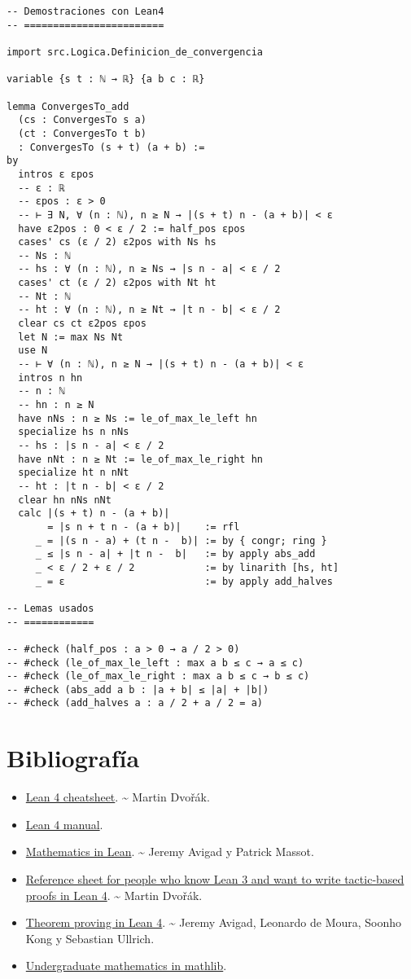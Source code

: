 \begin{verbatim}
-- Demostraciones con Lean4
-- ========================

import src.Logica.Definicion_de_convergencia

variable {s t : ℕ → ℝ} {a b c : ℝ}

lemma ConvergesTo_add
  (cs : ConvergesTo s a)
  (ct : ConvergesTo t b)
  : ConvergesTo (s + t) (a + b) :=
by
  intros ε εpos
  -- ε : ℝ
  -- εpos : ε > 0
  -- ⊢ ∃ N, ∀ (n : ℕ), n ≥ N → |(s + t) n - (a + b)| < ε
  have ε2pos : 0 < ε / 2 := half_pos εpos
  cases' cs (ε / 2) ε2pos with Ns hs
  -- Ns : ℕ
  -- hs : ∀ (n : ℕ), n ≥ Ns → |s n - a| < ε / 2
  cases' ct (ε / 2) ε2pos with Nt ht
  -- Nt : ℕ
  -- ht : ∀ (n : ℕ), n ≥ Nt → |t n - b| < ε / 2
  clear cs ct ε2pos εpos
  let N := max Ns Nt
  use N
  -- ⊢ ∀ (n : ℕ), n ≥ N → |(s + t) n - (a + b)| < ε
  intros n hn
  -- n : ℕ
  -- hn : n ≥ N
  have nNs : n ≥ Ns := le_of_max_le_left hn
  specialize hs n nNs
  -- hs : |s n - a| < ε / 2
  have nNt : n ≥ Nt := le_of_max_le_right hn
  specialize ht n nNt
  -- ht : |t n - b| < ε / 2
  clear hn nNs nNt
  calc |(s + t) n - (a + b)|
       = |s n + t n - (a + b)|    := rfl
     _ = |(s n - a) + (t n -  b)| := by { congr; ring }
     _ ≤ |s n - a| + |t n -  b|   := by apply abs_add
     _ < ε / 2 + ε / 2            := by linarith [hs, ht]
     _ = ε                        := by apply add_halves

-- Lemas usados
-- ============

-- #check (half_pos : a > 0 → a / 2 > 0)
-- #check (le_of_max_le_left : max a b ≤ c → a ≤ c)
-- #check (le_of_max_le_right : max a b ≤ c → b ≤ c)
-- #check (abs_add a b : |a + b| ≤ |a| + |b|)
-- #check (add_halves a : a / 2 + a / 2 = a)
\end{verbatim}

\chapter{Bibliografía}
\label{sec:orgb0397b2}

\begin{itemize}
\item \href{https://raw.githubusercontent.com/madvorak/lean4-cheatsheet/main/lean-tactics.pdf}{Lean 4 cheatsheet}. \textasciitilde{} Martin Dvořák.
\item \href{https://leanprover.github.io/lean4/doc/whatIsLean.html}{Lean 4 manual}.
\item \href{https://leanprover-community.github.io/mathematics\_in\_lean/mathematics\_in\_lean.pdf}{Mathematics in Lean}. \textasciitilde{} Jeremy Avigad y Patrick Massot.
\item \href{https://github.com/madvorak/lean3-tactic-lean4/blob/main/README.md}{Reference sheet for people who know Lean 3 and want to write tactic-based proofs in Lean 4}. \textasciitilde{} Martin Dvořák.
\item \href{https://leanprover.github.io/theorem\_proving\_in\_lean4/title\_page.html}{Theorem proving in Lean 4}. \textasciitilde{} Jeremy Avigad, Leonardo de Moura, Soonho
Kong y Sebastian Ullrich.
\item \href{https://leanprover-community.github.io/undergrad.html}{Undergraduate mathematics in mathlib}.
\end{itemize}


